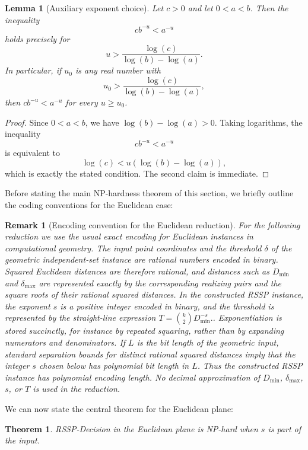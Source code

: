 \documentclass[11pt]{article}
\newtheorem{theorem}{Theorem}
\newtheorem{lemma}{Lemma}
\newtheorem{remark}{Remark}
\begin{document}
\begin{lemma}[Auxiliary exponent choice]\label{lem:aux-exp-choice}
Let $c>0$ and let $0<a<b$. Then the inequality
\[
cb^{-u}<a^{-u}
\]
holds precisely for
\[
u>\frac{\log(c)}{\log(b)-\log(a)}.
\]
In particular, if $u_0$ is any real number with
\[
u_0>\frac{\log(c)}{\log(b)-\log(a)},
\]
then $cb^{-u}<a^{-u}$ for every $u\ge u_0$.
\end{lemma}

\begin{proof}
Since $0<a<b$, we have $\log(b)-\log(a)>0$. Taking logarithms, the inequality
\[
cb^{-u}<a^{-u}
\]
is equivalent to
\[
\log(c)<u(\log(b)-\log(a)),
\]
which is exactly the stated condition. The second claim is immediate.
\end{proof}

Before stating the main NP-hardness theorem of this section, we briefly outline the coding conventions for the Euclidean case:

\begin{remark}[Encoding convention for the Euclidean reduction]
For the following reduction we use the usual exact encoding for Euclidean instances in computational geometry. The input point coordinates and the threshold $\delta$ of the geometric independent-set instance are rational numbers encoded in binary. Squared Euclidean distances are therefore rational, and distances such as $D_{\min}$ and $\delta_{\max}$ are represented exactly by the corresponding realizing pairs and the square roots of their rational squared distances. In the constructed RSSP instance, the exponent $s$ is a positive integer encoded in binary, and the threshold is represented by the straight-line expression
\(
T=\binom{k}{2}D_{\min}^{-s}.
\).
Exponentiation is stored succinctly, for instance by repeated squaring, rather than by expanding numerators and denominators. If $L$ is the bit length of the geometric input, standard separation bounds for distinct rational squared distances imply that the integer $s$ chosen below has polynomial bit length in $L$. Thus the constructed RSSP instance has polynomial encoding length. No decimal approximation of $D_{\min}$, $\delta_{\max}$, $s$, or $T$ is used in the reduction.
\end{remark}

We can now state the central theorem for the Euclidean plane:
\begin{theorem}\label{thm:gis}
RSSP-Decision in the Euclidean plane is NP-hard when $s$ is part of the input.
\end{theorem}
\end{document}
